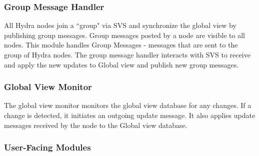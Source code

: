 \subsubsection{Group Message Handler}

All Hydra nodes join a ``group" via SVS and synchronize the global view by publishing group messages. Group messages posted by a node are visible to all nodes. This module handles Group Messages - messages that are sent to the group of Hydra nodes. The group message handler interacts with SVS to receive and apply the new updates to Global view and publish new group messages.


\subsubsection{Global View Monitor}
The global view monitor monitors the global view database for any changes. If a change is detected, it initiates an outgoing update message. It also applies update messages received by the node to the Global view database.

\subsubsection{User-Facing Modules}

